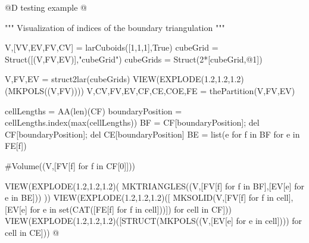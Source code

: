 \documentclass[11pt,oneside]{article}    %
\begin{document}
@D testing example @{
""" Visualization of indices of the boundary triangulation """

V,[VV,EV,FV,CV] = larCuboids([1,1,1],True)
cubeGrid = Struct([(V,FV,EV)],"cubeGrid")
cubeGrids = Struct(2*[cubeGrid,@1])

V,FV,EV = struct2lar(cubeGrids)
VIEW(EXPLODE(1.2,1.2,1.2)(MKPOLS((V,FV))))
V,CV,FV,EV,CF,CE,COE,FE = thePartition(V,FV,EV)

cellLengths = AA(len)(CF)
boundaryPosition = cellLengths.index(max(cellLengths))
BF = CF[boundaryPosition]; del CF[boundaryPosition]; del CE[boundaryPosition]
BE = list({e for f in BF for e in FE[f]})

#Volume((V,[FV[f] for f in CF[0]]))

VIEW(EXPLODE(1.2,1.2,1.2)( MKTRIANGLES((V,[FV[f] for f in BF],[EV[e] for e in BE])) ))
VIEW(EXPLODE(1.2,1.2,1.2)([ MKSOLID(V,[FV[f] for f in cell],[EV[e] for e in set(CAT([FE[f] for f in cell]))]) for cell in CF]))
VIEW(EXPLODE(1.2,1.2,1.2)([STRUCT(MKPOLS((V,[EV[e] for e in cell]))) for cell in CE]))
@}
\end{document}
